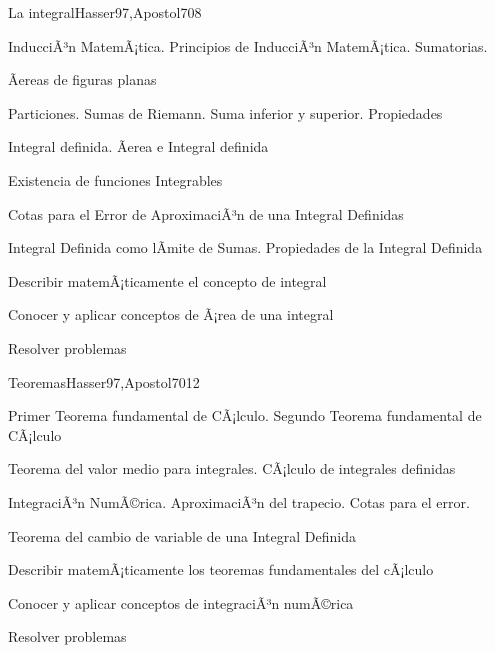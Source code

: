 \begin{syllabus}
\begin{unit}{La integral}{Hasser97,Apostol70}{8}
\begin{topics}
	\item InducciÃ³n MatemÃ¡tica. Principios de InducciÃ³n MatemÃ¡tica. Sumatorias.
	\item Ãereas de figuras planas
	\item Particiones. Sumas de Riemann. Suma inferior y superior. Propiedades
	\item Integral definida. Ãerea e Integral definida
	\item Existencia de funciones Integrables
	\item Cotas para el Error de AproximaciÃ³n de una Integral Definidas
	\item Integral Definida como lÃ­mite de Sumas. Propiedades de la Integral Definida
\end{topics}
\begin{unitgoals}
	\item Describir matemÃ¡ticamente el concepto de integral
	\item Conocer y aplicar conceptos de Ã¡rea de una integral
	\item Resolver problemas
\end{unitgoals}
\end{unit}

\begin{unit}{Teoremas}{Hasser97,Apostol70}{12}
\begin{topics}
      \item Primer Teorema fundamental de CÃ¡lculo. Segundo Teorema fundamental de CÃ¡lculo
      \item Teorema del valor medio para integrales. CÃ¡lculo de integrales definidas
      \item IntegraciÃ³n NumÃ©rica. AproximaciÃ³n del trapecio. Cotas para el error.
      \item Teorema del cambio de variable de una Integral Definida
\end{topics}

   \begin{unitgoals}
      \item Describir matemÃ¡ticamente los teoremas fundamentales del cÃ¡lculo
      \item Conocer y aplicar conceptos de integraciÃ³n numÃ©rica
	\item Resolver problemas
   \end{unitgoals}
\end{unit}


\end{syllabus}

